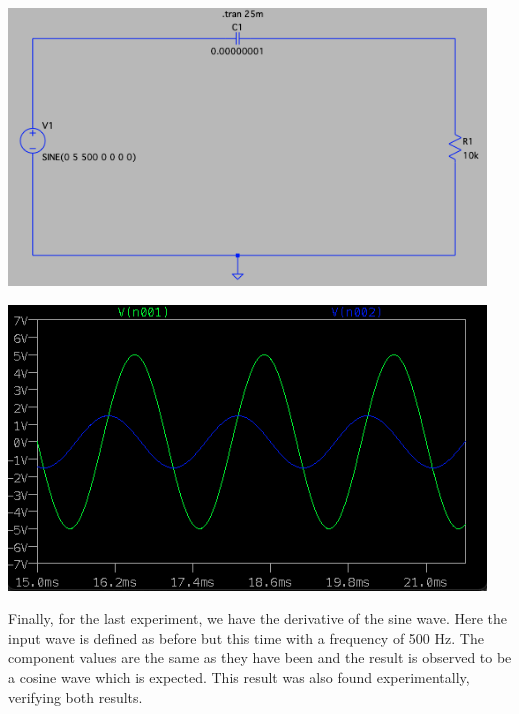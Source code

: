 \documentclass[12pt]{article}
\newcommand{\objects}[2]{%
  \leavevmode\vbox{\hbox{#1}\nointerlineskip\hbox{#2}}%
}
\begin{document}
    \begin{center}
        \objects
            {\includegraphics[width=0.95\textwidth]{4.3.6 LTSpice Circuit.png}}
            \:
            {\includegraphics[width=0.95\textwidth]{4.3.6 LTSpice Output.png}}
    \end{center}
    \par Finally, for the last experiment, we have the derivative of the sine wave. Here the input wave is defined as before but this time with a frequency of 500 Hz. The component values are the same as they have been and the result is observed to be a cosine wave which is expected. This result was also found experimentally, verifying both results.
\end{document}
